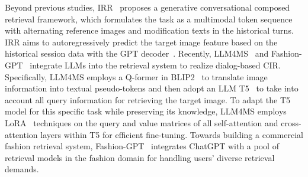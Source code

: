 Beyond previous studies, IRR~\cite{irr} proposes a generative conversational composed retrieval framework, which formulates the task as a multimodal token sequence with alternating reference images and modification texts in the historical turns. IRR aims to autoregressively predict the target image feature based on the historical session data with the GPT decoder~\cite{radford2018improving}. 
Recently, LLM4MS~\cite{llm4ms} and Fashion-GPT~\cite{fashiongpt}  integrate LLMs into the retrieval system to realize dialog-based CIR. Specifically, LLM4MS employs a Q-former in BLIP2~\cite{li2023blip2} to translate image information into textual pseudo-tokens and then adopt an LLM T5~\cite{raffel2020exploring} to take into account all query information for retrieving the target image. To adapt the T5 model for this specific task while preserving its knowledge, LLM4MS employs LoRA~\cite{hu2021lora} techniques on the query and value matrices of all self-attention and cross-attention layers within T5 for efficient fine-tuning. Towards building a commercial fashion retrieval system, Fashion-GPT~\cite{fashiongpt} integrates ChatGPT with a pool of retrieval models in the fashion domain for handling users' diverse retrieval demands. 


